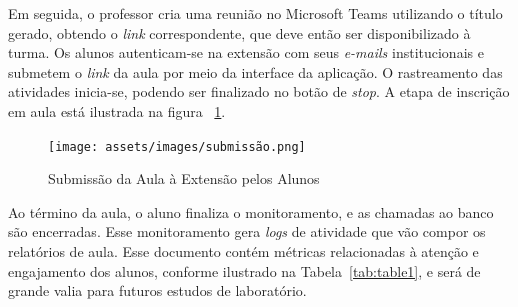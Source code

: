 Em seguida, o professor cria uma reunião no Microsoft Teams utilizando o título gerado, obtendo o \textit{link} correspondente, que deve então ser disponibilizado à turma. Os alunos autenticam-se na extensão com seus \textit{e-mails} institucionais e submetem o \textit{link} da aula por meio da interface da aplicação. O rastreamento das atividades inicia-se, podendo ser finalizado no botão de \textit{stop}. A etapa de inscrição em aula está ilustrada na figura ~\ref{fig:figura3}.

\begin{figure}[ht]
    \centering
    \texttt{[image: assets/images/submissão.png]}
    \caption{Submissão da Aula à Extensão pelos Alunos}
    \label{fig:figura3}
\end{figure}

Ao término da aula, o aluno finaliza o monitoramento, e as chamadas ao banco são encerradas. Esse monitoramento gera \textit{logs} de atividade que vão compor os relatórios de aula.
Esse documento contém métricas relacionadas à atenção e engajamento dos alunos, conforme ilustrado na Tabela~\ref{tab:table1}, e será de grande valia para futuros estudos de laboratório.

